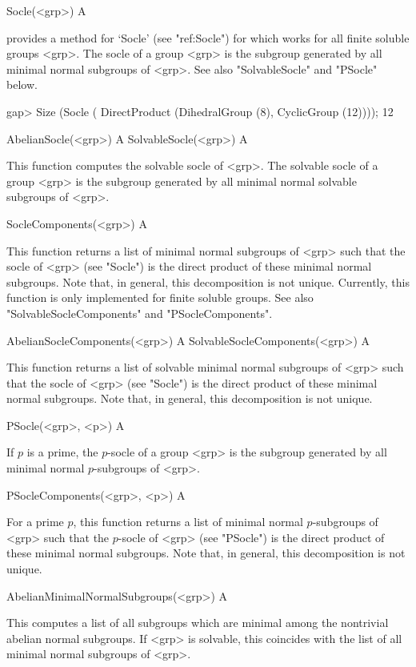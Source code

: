 \>Socle(<grp>) A

{\CRISP} provides a method for `Socle' (see "ref:Socle") for which works for 
all finite soluble groups <grp>. The socle of a group <grp> is the subgroup 
generated by all minimal normal subgroups of <grp>. See also "SolvableSocle" and 
"PSocle" below.

\beginexample
gap> Size (Socle ( DirectProduct (DihedralGroup (8), CyclicGroup (12))));
12
\endexample

\>AbelianSocle(<grp>) A
\>SolvableSocle(<grp>) A

This function computes the solvable socle of <grp>. The solvable socle of a group <grp> is the
subgroup  generated by all minimal normal solvable subgroups of <grp>.

\>SocleComponents(<grp>) A

This function returns a list of minimal normal subgroups of <grp> such 
that the socle of <grp> (see "Socle") is the direct product of these minimal normal
subgroups. Note that, in general, this decomposition is not unique. Currently,
this function is only implemented for finite soluble groups. See also 
"SolvableSocleComponents" and  "PSocleComponents".

\>AbelianSocleComponents(<grp>) A
\>SolvableSocleComponents(<grp>) A

This function returns a list of solvable minimal normal subgroups of <grp> such 
that the socle of <grp> (see "Socle") is the direct product of these minimal normal
subgroups. Note that, in general, this decomposition is not unique.

\>PSocle(<grp>, <p>) A

If $p$ is a prime, the $p$-socle of a group <grp> is the subgroup 
generated by all minimal normal $p$-subgroups of <grp>.

\>PSocleComponents(<grp>, <p>) A

For a prime $p$, this function returns a list of minimal normal $p$-subgroups of <grp>
such  that the $p$-socle of <grp> (see "PSocle") is the direct product of these minimal normal
subgroups. Note that, in general, this decomposition is not unique.

\>AbelianMinimalNormalSubgroups(<grp>) A

This computes a list of all subgroups which are minimal  among the nontrivial
abelian normal subgroups. If <grp> is solvable, this coincides with the list of all 
minimal normal subgroups of <grp>.


\null

